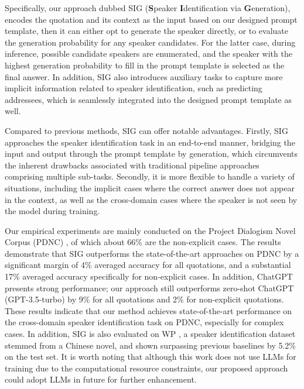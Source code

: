 \documentclass[letterpaper]{article} %
\begin{document}
Specifically, our approach dubbed SIG (\textbf{S}peaker  \textbf{I}dentification via \textbf{G}eneration), encodes the quotation and its context as the input based on our designed prompt template, then it can either opt to generate the speaker directly, or to evaluate the generation probability for any speaker candidates.
For the latter case, during inference, possible candidate speakers are enumerated, and the speaker with the highest generation probability to fill in the prompt template is selected as the final answer.
In addition, SIG also introduces auxiliary tasks to capture more implicit information related to speaker identification, such as predicting addressees, which is seamlessly integrated into the designed prompt template as well.

Compared to previous methods, SIG can offer notable advantages. Firstly, SIG approaches the speaker identification task in an end-to-end manner, bridging the input and output through the prompt template by generation, which circumvents the inherent drawbacks associated with traditional pipeline approaches comprising multiple sub-tasks. Secondly, it is more flexible to handle a variety of situations, including the implicit cases where the correct answer does not appear in the context, as well as the cross-domain cases where the speaker is not seen by the model during training.

Our empirical experiments are mainly conducted on the Project Dialogism Novel Corpus (PDNC) \citep{DBLP:conf/lrec/VishnubhotlaHH22}, of which about 66\% are the non-explicit cases. The results demonstrate that SIG outperforms the state-of-the-art approaches on PDNC by a significant margin of 4\% averaged accuracy for all quotations, and a substantial 17\% averaged accuracy specifically for non-explicit cases. In addition, ChatGPT presents strong performance; our approach still outperforms zero-shot ChatGPT (GPT-3.5-turbo) by 9\% for all quotations and 2\% for non-explicit quotations. 
These results indicate that our method achieves state-of-the-art performance on the cross-domain speaker identification task on PDNC, especially for complex cases.
In addition, SIG is also evaluated on WP \cite{chen2019chinese}, a speaker identification dataset stemmed from a Chinese novel, and shown surpassing previous baselines by 5.2\% on the test set.
It is worth noting that although this work does not use LLMs for training due to the computational resource constraints, our proposed approach could adopt LLMs in future for further enhancement.
\end{document}
